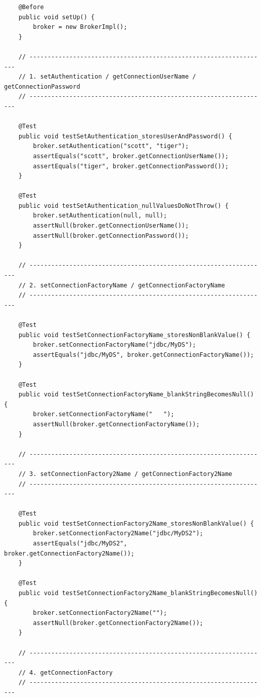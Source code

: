\begin{lstlisting}
    @Before
    public void setUp() {
        broker = new BrokerImpl();
    }

    // ------------------------------------------------------------------
    // 1. setAuthentication / getConnectionUserName / getConnectionPassword
    // ------------------------------------------------------------------

    @Test
    public void testSetAuthentication_storesUserAndPassword() {
        broker.setAuthentication("scott", "tiger");
        assertEquals("scott", broker.getConnectionUserName());
        assertEquals("tiger", broker.getConnectionPassword());
    }

    @Test
    public void testSetAuthentication_nullValuesDoNotThrow() {
        broker.setAuthentication(null, null);
        assertNull(broker.getConnectionUserName());
        assertNull(broker.getConnectionPassword());
    }

    // ------------------------------------------------------------------
    // 2. setConnectionFactoryName / getConnectionFactoryName
    // ------------------------------------------------------------------

    @Test
    public void testSetConnectionFactoryName_storesNonBlankValue() {
        broker.setConnectionFactoryName("jdbc/MyDS");
        assertEquals("jdbc/MyDS", broker.getConnectionFactoryName());
    }

    @Test
    public void testSetConnectionFactoryName_blankStringBecomesNull() {
        broker.setConnectionFactoryName("   ");
        assertNull(broker.getConnectionFactoryName());
    }

    // ------------------------------------------------------------------
    // 3. setConnectionFactory2Name / getConnectionFactory2Name
    // ------------------------------------------------------------------

    @Test
    public void testSetConnectionFactory2Name_storesNonBlankValue() {
        broker.setConnectionFactory2Name("jdbc/MyDS2");
        assertEquals("jdbc/MyDS2", broker.getConnectionFactory2Name());
    }

    @Test
    public void testSetConnectionFactory2Name_blankStringBecomesNull() {
        broker.setConnectionFactory2Name("");
        assertNull(broker.getConnectionFactory2Name());
    }

    // ------------------------------------------------------------------
    // 4. getConnectionFactory
    // ------------------------------------------------------------------


\end{lstlisting}

